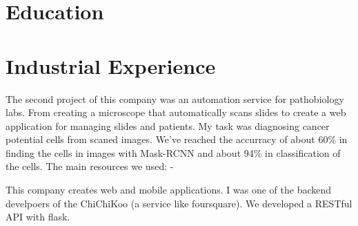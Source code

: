 \documentclass[11pt,a4paper,sans]{moderncv}        %
\begin{document}
\makecvtitle


\section{Education}




\section{Industrial Experience}
{
The second project of this company was an automation service for pathobiology
labs. From creating a microscope that automatically scans slides to create a web
application for managing slides and patients. My task was diagnosing cancer
potential cells from scaned images. We've reached the accurracy of about 60\% in finding
the cells in images with Mask-RCNN and about 94\% in classification of the cells.
\newline
The main resources we used: \href{https://www.researchgate.net/publication/309194269_Automated_Classification_of_Pap_Smear_Image_to_Detect_Cervical_Dysplasia}{\color{blue}{The article used for classification}} - \href{https://www.kaggle.com/c/data-science-bowl-2018/overview}{\color{blue}{Kaggle 2018 Data Science Bowl}}
\newline
}

{
This company creates web and mobile applications. I was one of the backend develpoers of the ChiChiKoo (a service like foursquare). We developed a RESTful API with flask.
\newline
}
\end{document}
